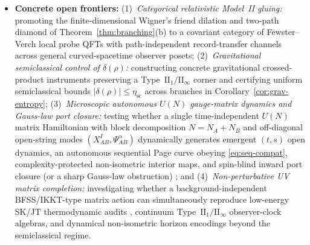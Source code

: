 \documentclass[11pt,a4paper]{article}
\theoremstyle{definition}
\theoremstyle{remark}
\newcommand{\bbZ}{\mathbb{Z}}
\newcommand{\1}{\mathbf{1}}
\begin{document}
\begin{itemize}
  (iv)~In finite dimensions, uniformly sharp polar-isometric $\ell^1$ bounds $\sqrt{1+\varepsilon}-\sqrt{1-\varepsilon}$ and $2\varepsilon/(1+\sqrt{1-\varepsilon^2})$ (embedding \cite{Kantorovich1948,Gustafson1968} with mixed-state purification contraction, Helstrom-POVM saturation, and contractive Kraus reweighting vs.\ Gisin bias $\varepsilon/2$) quantify Born-weight pullback defects whenever $\varepsilon<1$, while a strictly causal sequential unitary evaporation circuit $W_n^{\mathrm{seq}}$ obeying \eqref{eq:seq-compat} identically is explicitly separated from general co-isometric postselected dictionaries $(V_n,W_{\mathrm{pol},n})$ (with Stinespring equivalence \cite{Watrous2018}, a compatible kernel-carrying witness, fixed-seed incompatibility on both $W_{\mathrm{pol},n}$ and success-conditioned $\tilde{V}_n$ \cite{Chiribella2009}, and contrast against dynamical backwards-forwards circuit dictionaries \cite{DeWolfeHigginbotham2023}, Theorem~\ref{thm:nonisometric}); and
  (v)~A five-property audit separates Gisin ensemble independence, spatial semicausality, dictionary non-TP defects, kinematic Welch distinguishability lower bounds, and an exact $C_{\mathrm{tot}}=0$ bipolar-clock local CPTP channel completion $\Phi_A^{\mathrm{ex}}$ (showing also local constraint-commuting dephasing invariance and conditional $1/K_{\mathrm{bi}}$ vs.\ non-selective $0$ $B$-clock updating) vs.\ modular $\bbZ_K$ toys (Proposition~\ref{prop:branch-coupling}).
  \item \textbf{Concrete open frontiers:}
  (1)~\emph{Categorical relativistic Model~II gluing:} promoting the finite-dimensional Wigner's friend dilation and two-path diamond of Theorem~\ref{thm:branching}(b) to a covariant category of Fewster--Verch local probe QFTs \cite{FewsterVerch2020} with path-independent record-transfer channels across general curved-spacetime observer posets;
  (2)~\emph{Gravitational semiclassical control of $\delta(\rho)$:} constructing concrete gravitational crossed-product instruments preserving a Type~$\mathrm{II}_1/\mathrm{II}_\infty$ corner and certifying uniform semiclassical bounds $|\delta(\rho)|\le\eta_{\mathrm{sc}}$ across branches in Corollary~\ref{cor:grav-entropy};
  (3)~\emph{Microscopic autonomous $U(N)$ gauge-matrix dynamics and Gauss-law port closure:} testing whether a single time-independent $U(N)$ matrix Hamiltonian with block decomposition $N=N_A+N_B$ and off-diagonal open-string modes $(X^I_{AB},\Psi^\alpha_{AB})$ dynamically generates emergent $(t,s)$ open dynamics, an autonomous sequential Page curve obeying \eqref{eq:seq-compat}, complexity-protected non-isometric interior maps, and spin-blind inward port closure (or a sharp Gauss-law obstruction) \cite{BFSS1997,IKKT1997}; and
  (4)~\emph{Non-perturbative UV matrix completion:} investigating whether a background-independent BFSS/IKKT-type matrix action can simultaneously reproduce low-energy SK/JT thermodynamic audits \cite{Soga2026OSTQDSK}, continuum Type~$\mathrm{II}_1/\mathrm{II}_\infty$ observer-clock algebras, and dynamical non-isometric horizon encodings beyond the semiclassical regime.
\end{itemize}
\end{document}
